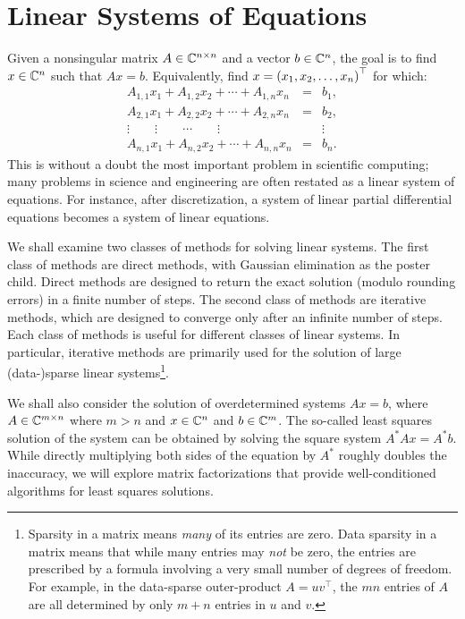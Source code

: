 \chapter{Linear Systems of Equations}\label{chapter:LinearSystems}

Given a nonsingular matrix $A\in\mathbb{C}^{n\times n}$ and a vector $b\in\mathbb{C}^n$, the goal is to find $x\in\mathbb{C}^n$ such that $Ax=b$. Equivalently, find $x=\pr(x_1,x_2,\ldots,x_n)^\top$ for which:
\begin{equation}
\begin{array}{ccc}
A_{1,1}x_1 + A_{1,2}x_2+\cdots+A_{1,n}x_n & = & b_1,\\
A_{2,1}x_1 + A_{2,2}x_2+\cdots+A_{2,n}x_n & = & b_2,\\
\vdots \qquad \vdots \qquad \cdots \qquad \vdots & & \vdots \\
A_{n,1}x_1 + A_{n,2}x_2+\cdots+A_{n,n}x_n & = & b_n.
\end{array}
\end{equation}
This is without a doubt the most important problem in scientific computing; many problems in science and engineering are often restated as a linear system of equations. For instance, after discretization, a system of linear partial differential equations becomes a system of linear equations.

We shall examine two classes of methods for solving linear systems. The first class of methods are direct methods, with Gaussian elimination as the poster child. Direct methods are designed to return the exact solution (modulo rounding errors) in a finite number of steps. The second class of methods are iterative methods, which are designed to converge only after an infinite number of steps. Each class of methods is useful for different classes of linear systems. In particular, iterative methods are primarily used for the solution of large (data-)sparse linear systems\footnote{Sparsity in a matrix means {\em many} of its entries are zero. Data sparsity in a matrix means that while many entries may {\em not} be zero, the entries are prescribed by a formula involving a very small number of degrees of freedom. For example, in the data-sparse outer-product $A=uv^\top$, the $mn$ entries of $A$ are all determined by only $m+n$ entries in $u$ and $v$.}.

We shall also consider the solution of overdetermined systems $Ax=b$, where $A\in\mathbb{C}^{m\times n}$ where $m>n$ and $x\in\mathbb{C}^n$ and $b\in\mathbb{C}^m$. The so-called least squares solution of the system can be obtained by solving the square system $A^* Ax = A^* b$. While directly multiplying both sides of the equation by $A^*$ roughly doubles the inaccuracy, we will explore matrix factorizations that provide well-conditioned algorithms for least squares solutions.


